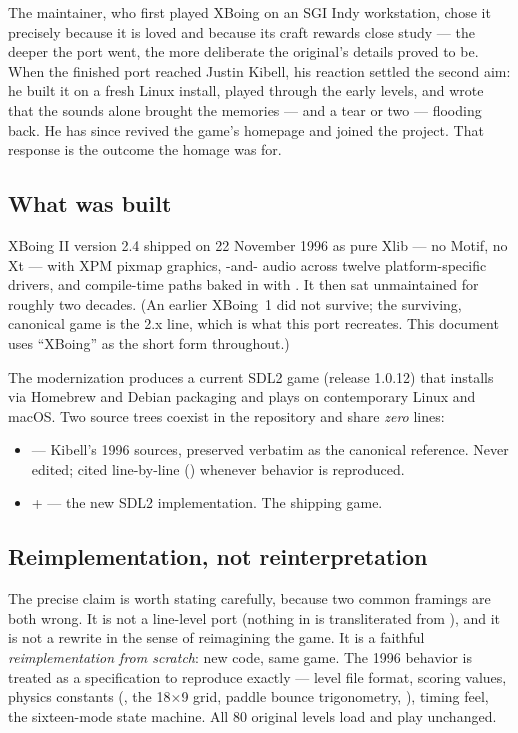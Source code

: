 \documentclass[11pt,a4paper]{article}
\begin{document}
The maintainer, who first played XBoing on an SGI Indy workstation, chose it
precisely because it is loved and because its craft rewards close study ---
the deeper the port went, the more deliberate the original's details proved
to be. When the finished port reached Justin Kibell, his reaction settled the
second aim: he built it on a fresh Linux install, played through the early
levels, and wrote that the sounds alone brought the memories --- and a tear
or two --- flooding back. He has since revived the game's homepage and joined
the project. That response is the outcome the homage was for.

\subsection{What was built}

XBoing II version 2.4 shipped on 22 November 1996 as pure Xlib --- no Motif,
no Xt --- with XPM pixmap graphics, -and- audio
across twelve platform-specific drivers, and compile-time paths baked in with
. It then sat unmaintained for roughly two decades. (An
earlier XBoing~1 did not survive; the surviving, canonical game is the 2.x
line, which is what this port recreates. This document uses ``XBoing'' as the
short form throughout.)

The modernization produces a current SDL2 game (release 1.0.12) that
installs via Homebrew and Debian packaging and plays on contemporary Linux
and macOS. Two source trees coexist in the repository and share
\emph{zero} lines:

\begin{itemize}[nosep]
  \item {} --- Kibell's 1996 sources, preserved verbatim
        as the canonical reference. Never edited; cited line-by-line
        () whenever behavior is
        reproduced.
  \item {} +  --- the new SDL2
        implementation. The shipping game.
\end{itemize}

\subsection{Reimplementation, not reinterpretation}

The precise claim is worth stating carefully, because two common framings
are both wrong. It is not a line-level port (nothing in  is
transliterated from ), and it is not a rewrite in the
sense of reimagining the game. It is a faithful \emph{reimplementation from
scratch}: new code, same game. The 1996 behavior is treated as a
specification to reproduce exactly --- level file format, scoring values,
physics constants (, the 18$\times$9 grid, paddle bounce
trigonometry, ), timing feel, the sixteen-mode state
machine. All 80 original levels load and play unchanged.
\end{document}
